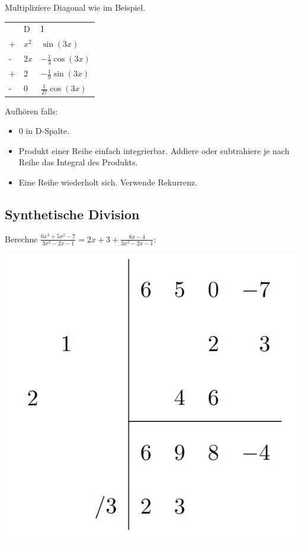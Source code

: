 \documentclass[a4paper,10pt]{article}
\begin{document}
Multipliziere Diagonal wie im Beispiel.

\begin{table}[h]
  \begin{tabular}{lll}
    & D & I \\
  + & $x^2$ & $\sin(3x)$  \\
  - & $2x$ & $-\frac{1}{3}\cos(3x)$  \\
  + & $2$ & $-\frac{1}{9}\sin(3x)$  \\
  - & $0$ & $\frac{1}{27}\cos(3x)$  
  \end{tabular}
\end{table}

Aufhören falls:
\begin{itemize}
  \item $0$ in D-Spalte.
  \item Produkt einer Reihe einfach integrierbar. Addiere oder subtrahiere je nach Reihe das Integral des Produkts.
  \item Eine Reihe wiederholt sich. Verwende Rekurrenz.
\end{itemize}

\subsection{Synthetische Division}
Berechne $\frac{6x^3 + 5x^2 - 7}{3x^2 - 2x - 1} = 2x + 3 + \frac{8x - 4}{3x^2 -2x - 1}$:\\
\begin{center}
  \includegraphics[width=0.4 \linewidth]{synthetic-division.png}
\end{center}
\end{document}
